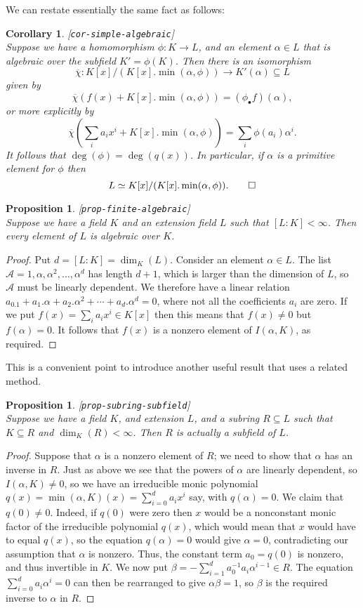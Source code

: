 \documentclass{amsart}
\newcommand{\lbl}[1]{\label{#1}\textup{[\texttt{#1}]}\ \\}
\newcommand{\lbl}{\label}
\newcommand{\al}        {\alpha}
\newcommand{\bt}        {\beta}
\newcommand{\CA}        {{\mathcal{A}}}
\newcommand{\ov}[1]     {\overline{#1}}
\newcommand{\sse}       {\subseteq}
\renewcommand{\:}{\colon}
\newtheorem{proposition}[theorem]{Proposition}
\newtheorem{corollary}[theorem]{Corollary}
\theoremstyle{definition}
\begin{document}
We can restate essentially the same fact as follows:
\begin{corollary}\lbl{cor-simple-algebraic}
 Suppose we have a homomorphism $\phi\:K\to L$, and an element
 $\al\in L$ that is algebraic over the subfield $K'=\phi(K)$.  Then
 there is an isomorphism 
 \[ \ov{\chi}\:K[x]/(K[x].\min(\al,\phi))\to K'(\al)\sse L \]
 given by 
 \[ \ov{\chi}(f(x)+K[x].\min(\al,\phi)) = 
     (\phi_\bullet f)(\al),
 \]
 or more explicitly by 
 \[ \ov{\chi}(\sum_ia_ix^i+K[x].\min(\al,\phi)) =
     \sum_i\phi(a_i)\al^i.
 \]
 It follows that $\deg(\phi)=\deg(q(x))$.  In particular, if $\al$ is
 a primitive element for $\phi$ then
 \[ L\simeq K[x]/(K[x].\min(\al,\phi)). \qed \]
\end{corollary}

\begin{proposition}\lbl{prop-finite-algebraic}
 Suppose we have a field $K$ and an extension field $L$ such that
 $[L:K]<\infty$.  Then every element of $L$ is algebraic over
 $K$.  
\end{proposition}
\begin{proof}
 Put $d=[L:K]=\dim_K(L)$.  Consider an element $\al\in L$.  The list
 $\CA=1,\al,\al^2,\dotsc,\al^d$ has length $d+1$, which is larger than
 the dimension of $L$, so $\CA$ must be linearly dependent.  We
 therefore have a linear relation
 $a_0.1+a_1.\al+a_2.\al^2+\dotsb+a_d.\al^d=0$, where not all the
 coefficients $a_i$ are zero.  If we put $f(x)=\sum_ia_ix^i\in K[x]$
 then this means that $f(x)\neq 0$ but $f(\al)=0$.  It follows that
 $f(x)$ is a nonzero element of $I(\al,K)$, as required.
\end{proof}

This is a convenient point to introduce another useful result that
uses a related method.

\begin{proposition}\lbl{prop-subring-subfield}
 Suppose we have a field $K$, and extension $L$, and a subring
 $R\sse L$ such that $K\sse R$ and $\dim_K(R)<\infty$.  Then $R$ is
 actually a subfield of $L$.
\end{proposition}
\begin{proof}
 Suppose that $\al$ is a nonzero element of $R$; we need to show that
 $\al$ has an inverse in $R$.  Just as above we see that the powers of
 $\al$ are linearly dependent, so $I(\al,K)\neq 0$, so we have an
 irreducible monic polynomial $q(x)=\min(\al,K)(x)=\sum_{i=0}^da_ix^i$
 say, with $q(\al)=0$.  We claim that $q(0)\neq 0$.  Indeed, if $q(0)$
 were zero then $x$ would be a nonconstant monic factor of the
 irreducible polynomial $q(x)$, which would mean that $x$ would have
 to equal $q(x)$, so the equation $q(\al)=0$ would give $\al=0$,
 contradicting our assumption that $\al$ is nonzero.  Thus, the
 constant term $a_0=q(0)$ is nonzero, and thus invertible in $K$.  We
 now put $\bt=-\sum_{i=1}^da_0^{-1}a_i\al^{i-1}\in R$.  The equation
 $\sum_{i=0}^da_i\al^i=0$ can then be rearranged to give $\al\bt=1$,
 so $\bt$ is the required inverse to $\al$ in $R$.
\end{proof}
\end{document}
